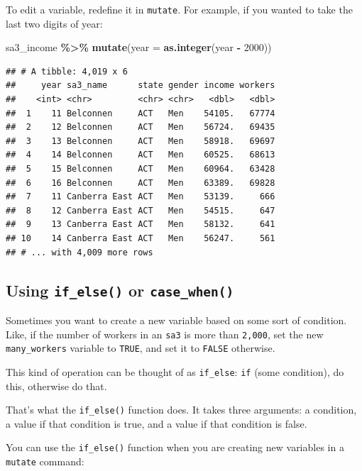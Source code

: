 \documentclass[
]{book}
\newenvironment{Shaded}{\begin{snugshade}}{\end{snugshade}}
\newcommand{\DataTypeTok}[1]{\textcolor[rgb]{0.13,0.29,0.53}{#1}}
\newcommand{\DecValTok}[1]{\textcolor[rgb]{0.00,0.00,0.81}{#1}}
\newcommand{\KeywordTok}[1]{\textcolor[rgb]{0.13,0.29,0.53}{\textbf{#1}}}
\newcommand{\NormalTok}[1]{#1}
\newcommand{\OperatorTok}[1]{\textcolor[rgb]{0.81,0.36,0.00}{\textbf{#1}}}
\newcommand{\StringTok}[1]{\textcolor[rgb]{0.31,0.60,0.02}{#1}}
\begin{document}
To edit a variable, redefine it in \texttt{mutate}. For example, if you wanted to take the last two digits of year:

\begin{Shaded}
\begin{Highlighting}[]
\NormalTok{sa3\_income }\OperatorTok{\%\textgreater{}\%}\StringTok{ }
\StringTok{  }\KeywordTok{mutate}\NormalTok{(}\DataTypeTok{year =} \KeywordTok{as.integer}\NormalTok{(year }\OperatorTok{{-}}\StringTok{ }\DecValTok{2000}\NormalTok{))}
\end{Highlighting}
\end{Shaded}

\begin{verbatim}
## # A tibble: 4,019 x 6
##     year sa3_name      state gender income workers
##    <int> <chr>         <chr> <chr>   <dbl>   <dbl>
##  1    11 Belconnen     ACT   Men    54105.   67774
##  2    12 Belconnen     ACT   Men    56724.   69435
##  3    13 Belconnen     ACT   Men    58918.   69697
##  4    14 Belconnen     ACT   Men    60525.   68613
##  5    15 Belconnen     ACT   Men    60964.   63428
##  6    16 Belconnen     ACT   Men    63389.   69828
##  7    11 Canberra East ACT   Men    53139.     666
##  8    12 Canberra East ACT   Men    54515.     647
##  9    13 Canberra East ACT   Men    58132.     641
## 10    14 Canberra East ACT   Men    56247.     561
## # ... with 4,009 more rows
\end{verbatim}

\hypertarget{using-if_else-or-case_when}{%
\subsection{\texorpdfstring{Using \texttt{if\_else()} or \texttt{case\_when()}}{Using if\_else() or case\_when()}}\label{using-if_else-or-case_when}}

Sometimes you want to create a new variable based on some sort of condition. Like, if the number of workers in an \texttt{sa3} is more than \texttt{2,000}, set the new \texttt{many\_workers} variable to \texttt{TRUE}, and set it to \texttt{FALSE} otherwise.

This kind of operation can be thought of as \texttt{if\_else}: \texttt{if} (some condition), do this, otherwise do that.

That's what the \texttt{if\_else()} function does. It takes three arguments: a condition, a value if that condition is true, and a value if that condition is false.

You can use the \texttt{if\_else()} function when you are creating new variables in a \texttt{mutate} command:
\end{document}
